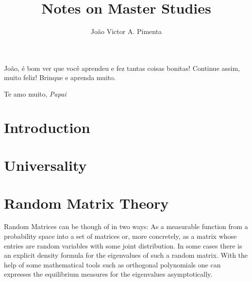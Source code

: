 \documentclass[]{report}
\title{Notes on Master Studies}
\author{João Victor A. Pimenta}
\makeatletter
\renewcommand\tableofcontents{%
	\section*{\huge\centering\contentsname
		\@mkboth{%
			\MakeUppercase\contentsname}{\MakeUppercase\contentsname}}%
	\vspace{24pt}%
	\@starttoc{toc}%
	\newpage%
}
\numberwithin{equation}{section} %
\makeatother
\begin{document}
\maketitle
\tableofcontents



\vspace*{\fill}
\epigraph{João, é bom ver que você aprendeu e fez tantas coisas bonitas! Continue assim, muito feliz! Brinque e aprenda muito.}{Te amo muito, \textit{Papai}}


\chapter{Introduction}



\chapter{Universality}



\chapter{Random Matrix Theory}

Random Matrices can be though of in two ways: As a measurable function from a probability space into a set of matrices or, more concretely, as a matrix whose entries are random variables with some joint distribution. In some cases there is an explicit density formula for the eigenvalues of such a random matrix. With the help of some mathematical tools such as orthogonal polynomials one can expresses the equilibrium measures for the eigenvalues asymptotically.







\label{Vandermonde}

\end{document}
